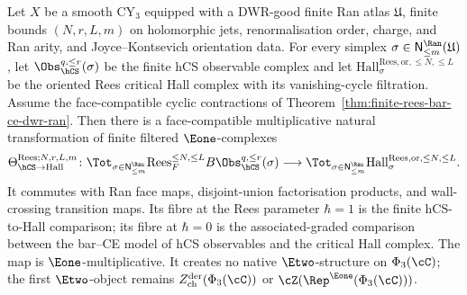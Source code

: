 \begin{theorem}
\label{thm:finite-dwr-ran-rees-hcs-hall-compatibility}
Let $X$ be a smooth CY$_3$ equipped with a DWR-good finite Ran atlas
$\mathfrak U$, finite bounds $(N,r,L,m)$ on holomorphic jets,
renormalisation order, charge, and Ran arity, and Joyce--Kontsevich
orientation data.  For every simplex
\(\sigma\in\mathsf N^{\Ran}_{\le m}(\mathfrak U)\), let
\(\Obs_{\hCS}^{q,\le r}(\sigma)\) be the finite hCS observable complex
and let
\(\mathrm{Hall}^{\mathrm{Rees},\mathrm{or},\le N,\le L}_{\sigma}\)
be the oriented Rees critical Hall complex with its vanishing-cycle
filtration.  Assume the face-compatible cyclic contractions of
Theorem~\ref{thm:finite-rees-bar-ce-dwr-ran}.  Then there is a
face-compatible multiplicative natural transformation of finite
filtered \(\Eone\)-complexes
\[
 \Theta_{\hCS\to\mathrm{Hall}}^{\mathrm{Rees};N,r,L,m}\colon
 \Tot_{\sigma\in\mathsf N^{\Ran}_{\le m}}
 \mathrm{Rees}_{F}^{\le N,\le L}B\Obs_{\hCS}^{q,\le r}(\sigma)
 \longrightarrow
 \Tot_{\sigma\in\mathsf N^{\Ran}_{\le m}}
 \mathrm{Hall}^{\mathrm{Rees},\mathrm{or},\le N,\le L}_{\sigma}.
\]
It commutes with Ran face maps, disjoint-union factorisation products,
and wall-crossing transition maps.  Its fibre at the Rees parameter
\(\hbar=1\) is the finite hCS-to-Hall comparison; its fibre at
\(\hbar=0\) is the associated-graded comparison between the bar--CE
model of hCS observables and the critical Hall complex.  The map is
\(\Eone\)-multiplicative.  It creates no native \(\Etwo\)-structure on
\(\Phi_3(\cC)\); the first \(\Etwo\)-object remains
\(Z^{\mathrm{der}}_{\mathrm{ch}}(\Phi_3(\cC))\) or
\(\cZ(\Rep^{\Eone}(\Phi_3(\cC)))\).
\end{theorem}

